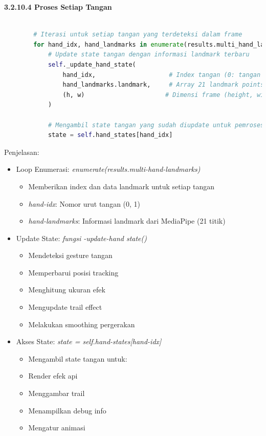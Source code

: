 \documentclass[11pt,a4paper]{article}
\begin{document}
    \noindent\textbf{3.2.10.4 Proses Setiap Tangan}
    \begin{lstlisting}[language=Python, caption=Proses Setiap Tangan]
    
        # Iterasi untuk setiap tangan yang terdeteksi dalam frame
        for hand_idx, hand_landmarks in enumerate(results.multi_hand_landmarks):
            # Update state tangan dengan informasi landmark terbaru
            self._update_hand_state(
                hand_idx,                    # Index tangan (0: tangan pertama, 1: tangan kedua)
                hand_landmarks.landmark,     # Array 21 landmark points dari MediaPipe
                (h, w)                      # Dimensi frame (height, width)
            )
            
            # Mengambil state tangan yang sudah diupdate untuk pemrosesan selanjutnya
            state = self.hand_states[hand_idx]
    \end{lstlisting}
    Penjelasan:
    \begin{itemize}
        \item Loop Enumerasi: \textit{enumerate(results.multi-hand-landmarks)}
        \begin{itemize}
            \item Memberikan index dan data landmark untuk setiap tangan
            \item \textit{hand-idx}: Nomor urut tangan (0, 1)
            \item \textit{hand-landmarks}: Informasi landmark dari MediaPipe (21 titik)
        \end{itemize}
        \item Update State: \textit{fungsi -update-hand state()} 
        \begin{itemize}
            \item Mendeteksi gesture tangan
            \item Memperbarui posisi tracking
            \item Menghitung ukuran efek
            \item Mengupdate trail effect
            \item Melakukan smoothing pergerakan
        \end{itemize}
        \item Akses State: \textit{state = self.hand-states[hand-idx]}
        \begin{itemize}
            \item Mengambil state tangan untuk:
            \item Render efek api
            \item Menggambar trail
            \item Menampilkan debug info
            \item Mengatur animasi
        \end{itemize}
    \end{itemize}
\end{document}
